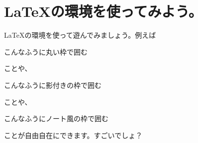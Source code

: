 \documentclass{ltjsarticle}
\begin{document}
\section{\LaTeX の環境を使ってみよう。}
\LaTeX の環境を使って遊んでみましょう。例えば
\begin{screen}
こんなふうに丸い枠で囲む
\end{screen}
ことや、
\begin{shadebox}
こんなふうに影付きの枠で囲む
\end{shadebox}
ことや、
\begin{boxnote}
こんなふうにノート風の枠で囲む
\end{boxnote}
ことが自由自在にできます。すごいでしょ？
\end{document}
